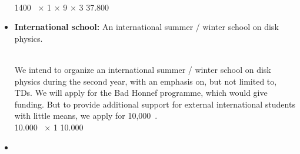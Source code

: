 \documentclass[10pt,fleqn,twoside,a4paper]{article}
\begin{document}
\begin{itemize}
\vspace{0.2em}\\
1400~\EUR{} $\times$ 1 $\times$ 9 $\times$ 3    \hfill 37.800~\EUR{}\\
\item 
\begin{Emphasize}
{\bf International school:} An international summer / winter school on disk physics.
\end{Emphasize}\\
We intend to organize an international summer / winter school on disk physics
during the second year,
with an emphasis on, but not limited to, TDs. We will apply for the Bad Honnef
programme, which would give funding. But to provide additional support for
external international students with little means, we apply for 10,000~\EUR{}. 
\vspace{0.2em}\\
10.000~\EUR{} $\times$ 1              \hfill 10.000~\EUR{}\\
\item 

\end{itemize}
\end{document}
